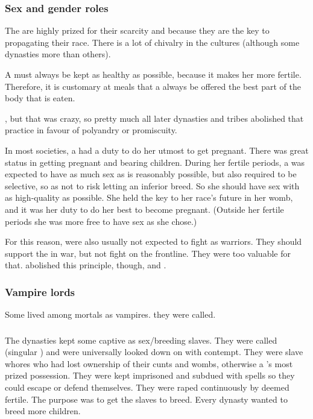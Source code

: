 \subsubsection{Sex and gender roles}
The \resviel{} are highly prized for their scarcity and because they are the key to propagating their race. 
There is a lot of chivalry in the \resphan{} cultures (although some dynasties more than others). 

A \resvil{} must always be kept as healthy as possible, because it makes her more fertile. 
Therefore, it is customary at meals that a \resvil{} always be offered the best part of the body that is eaten. 

\Merkyrah{} , but that was crazy, so pretty much all later \resphan{} dynasties and tribes abolished that practice in favour of polyandry or promiscuity.

In most \resphan{} societies, a \resvil{} had a duty to do her utmost to get pregnant. 
There was great status in getting pregnant and bearing children. 
During her fertile periods, a \resvil{} was expected to have as much sex as is reasonably possible, but also required to be selective, so as not to risk letting an inferior \resphan{} breed. 
So she should have sex with as high-quality \resphain{} as possible. 
She held the key to her race's future in her womb, and it was her duty to do her best to become pregnant. 
(Outside her fertile periods she was more free to have sex as she chose.)

For this reason, \resviel{} were also usually not expected to fight as warriors. 
They should support the \resphain{} in war, but not fight on the frontline. 
They were too valuable for that. 
\Mystraacht{} abolished this principle, though, and . 





\subsubsection{Vampire lords}
Some \ashenblood \resphain lived among mortals as vampires.
\quo{\Reavers} they were called. 





\subsubsection[Yurideth]{\Yurideth}
\index{\yurid}
The \resphan{} dynasties kept some captive \resviel{} as sex/breeding slaves. 
They were called \yurideth{} (singular \yurid{}) and were universally looked down on with contempt. They were slave whores who had lost ownership of their cunts and wombs, otherwise a \resvil{}'s most prized possession.
They were kept imprisoned and subdued with spells so they could escape or defend themselves. They were raped continuously by \resphain{} deemed fertile. The purpose was to get the slaves to breed. Every dynasty wanted to breed more children. 

